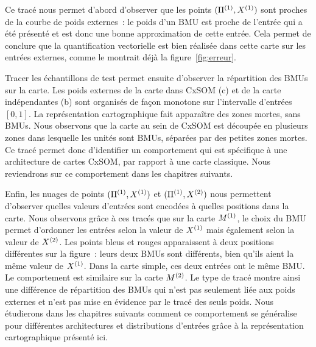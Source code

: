 \documentclass[../main]{subfiles}
\begin{document}
Ce tracé nous permet d'abord d'observer que les points $(\Pi^{({1})},X^{({1})})$ sont proches de la courbe de poids externes~: le poids d'un BMU est proche de l'entrée qui a été présenté et est donc une bonne approximation de cette entrée. Cela permet de conclure que la quantification vectorielle est bien réalisée dans cette carte sur les entrées externes, comme le montrait déjà la figure~\ref{fig:erreur}.

Tracer les échantillons de test permet ensuite d'observer la répartition des BMUs sur la carte. Les poids externes de la carte dans CxSOM (c) et de la carte indépendantes (b) sont organisés de façon monotone sur l'intervalle d'entrées $[0,1]$.
La représentation cartographique fait apparaître des zones mortes, sans BMUs. 
Nous observons que la carte au sein de CxSOM est découpée en plusieurs zones dans lesquelle les unités sont BMUs, séparées par des petites zones mortes. Ce tracé permet donc d'identifier un comportement qui est spécifique à une architecture de cartes CxSOM, par rapport à une carte classique. Nous reviendrons sur ce comportement dans les chapitres suivants.

Enfin, les nuages de points $(\Pi^{({1})},X^{({1})})$ et $(\Pi^{({1})},X^{({2})})$ nous permettent d'observer quelles valeurs d'entrées sont encodées à quelles positions dans la carte.
Nous observons grâce à ces tracés que sur la carte $M^{({1})}$, le choix du BMU permet d'ordonner les entrées selon la valeur de $X^{({1})}$ mais également selon la valeur de $X^{({2})}$. 
Les points bleus et rouges apparaissent à deux positions différentes sur la figure~: leurs deux BMUs sont différents, bien qu'ils aient la même valeur de $X^{({1})}$. Dans la carte simple, ces deux entrées ont le même BMU.
Le comportement est similaire sur la carte $M^{({2})}$. Le type de tracé montre ainsi une différence de répartition des BMUs qui n'est pas seulement liée aux poids externes et n'est pas mise en évidence par le tracé des seuls poids.
Nous étudierons dans les chapitres suivants comment ce comportement se généralise pour différentes architectures et distributions d'entrées grâce à la représentation cartographique présenté ici.
\end{document}
